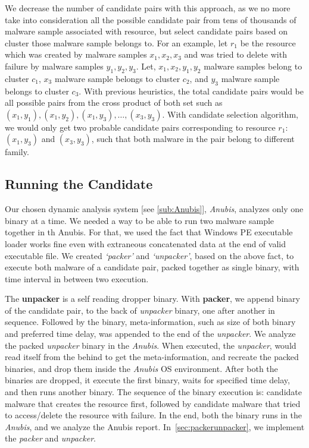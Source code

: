 We decrease the number of candidate pairs with this approach, as we no more take into consideration all the possible candidate pair from tens of thousands of malware sample associated with resource, but select candidate pairs based on cluster those malware sample belongs to.
For an example, let $r_1$ be the resource which was created by malware samples $x_1,x_2,x_3$ and was tried to delete with failure by malware samples $y_1, y_2, y_3$.
Let, $x_1,x_2,y_1,y_2$ malware samples belong to cluster $c_1$, $x_3$ malware sample belongs to cluster $c_2$, and $y_3$ malware sample belongs to cluster $c_3$.
With previous heuristics, the total candidate pairs would be all possible pairs from the cross product of both set such as $(x_1,y_1), (x_1,y_2), (x_1,y_3),\ldots ,(x_3, y_3)$.
With candidate selection algorithm, we would only get two probable candidate pairs corresponding to resource $r_1$: $(x_1,y_3)$ and $(x_3,y_3)$, such that both malware in the pair belong to different family.
\subsection{Running the Candidate}
\label{sub:Running the Candidate}
Our chosen dynamic analysis system [see \autoref{sub:Anubis}], \emph{Anubis}, analyzes only one binary at a time.
We needed a way to be able to run two malware sample together in th Anubis.
For that, we used the fact that Windows PE executable loader works fine even with extraneous concatenated data at the end of valid executable file.
We created \emph{`packer'} and \emph{`unpacker'}, based on the above fact, to execute both malware of a candidate pair, packed together as single binary, with time interval in between two execution.

The \textbf{unpacker} is a self reading dropper binary.
With \textbf{packer}, we append binary of the candidate pair, to the back of \emph{unpacker} binary, one after another in sequence.
Followed by the binary, meta-information, such as size of both binary and preferred time delay, was appended to the end of the \emph{unpacker}.
We analyze the packed \emph{unpacker} binary in the \emph{Anubis}.
When executed, the \emph{unpacker}, would read itself from the behind to get the meta-information, and recreate the packed binaries, and drop them inside the \emph{Anubis} OS environment.
After both the binaries are dropped, it execute the first binary, waits for specified time delay, and then runs another binary.
The sequence of the binary execution is: candidate malware that creates the resource first, followed by candidate malware that tried to access/delete the resource with failure.
In the end, both the binary runs in the \emph{Anubis}, and we analyze the Anubis report.
In~\autoref{sec:packerunpacker}, we implement the \emph{packer} and \emph{unpacker}.
